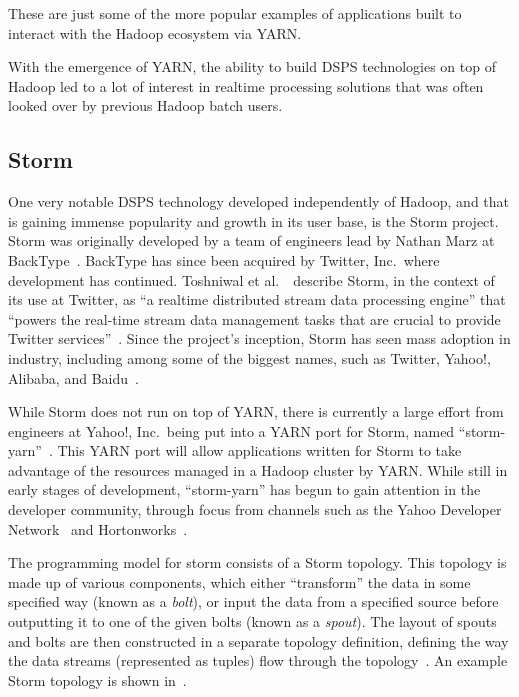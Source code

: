 These are just some of the more popular examples of applications built to interact with the Hadoop ecosystem via YARN.

With the emergence of YARN, the ability to build DSPS technologies on top of Hadoop led to a lot of interest in realtime
processing solutions that was often looked over by previous Hadoop batch users.



\subsection{Storm} %
\label{ssub:storm}

One very notable DSPS technology developed independently of Hadoop, and that is gaining immense popularity and growth in its
user base, is the Storm project. Storm was originally developed by a team of engineers lead by Nathan Marz at
BackType~\cite{web_storm}. BackType has since been acquired by Twitter, Inc.\ where development has
continued. Toshniwal et al.~\cite{toshniwal2014storm}\ describe Storm, in the context of its use at Twitter, as ``a
realtime distributed stream data processing engine'' that ``powers the real-time stream data management tasks that are
crucial to provide Twitter services''~\cite[p.\ 147]{toshniwal2014storm}. Since the project's inception, Storm has seen mass
adoption in industry, including among some of the biggest names, such as Twitter, Yahoo!, Alibaba, and
Baidu~\cite{storm_users}.

While Storm does not run on top of YARN, there is currently a large effort from engineers at Yahoo!, Inc.\ being put
into a YARN port for Storm, named ``storm-yarn''~\cite{web_storm_yarn,kumar2014architectural}. This YARN port will
allow applications written for Storm to take advantage of the resources managed in a Hadoop cluster by YARN. While still
in early stages of development, ``storm-yarn'' has begun to gain attention in the developer community, through focus from
channels such as the Yahoo Developer Network~\cite{web_yahoo_blog} and Hortonworks~\cite{web_hortonworks_blog}.

The programming model for storm consists of a Storm topology. This topology is made up of various components, which
either ``transform'' the data in some specified way (known as a \textit{bolt}), or input the data from a specified source
before outputting it to one of the given bolts (known as a \textit{spout}). The layout of spouts and bolts are then
constructed in a separate topology definition, defining the way the data streams (represented as tuples) flow through
the topology~\cite{jones2013process}. An example Storm topology is shown in~.

